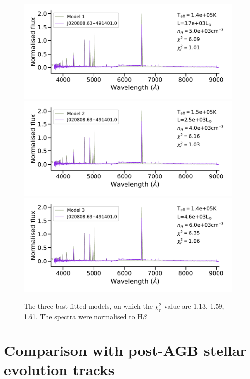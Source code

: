 \documentclass[fleqn,usenatbib]{mnras}
\begin{document}
{\begin{figure}
\centering
\includegraphics[width=0.89\linewidth, trim=10 90 10 10, clip]{Figs/model_140000_37.15_3.70.pdf}
\includegraphics[width=0.89\linewidth, trim=10 90 10 10, clip]{Figs/model_150000_36.98_3.60.pdf}
\includegraphics[width=0.89\linewidth, trim=10 10 10 10, clip]{Figs/model_140000_37.25_3.78.pdf}
\caption{The three best fitted models, on which the $\chi^2_r$ value are 1.13, 1.59, 1.61.
  The spectra were normalised to H{$\beta$}} 
  \label{fig:spectra-obs-model}
\end{figure}

\section{Comparison with post-AGB stellar evolution tracks}
\label{sec:tracks}

}
\end{document}

